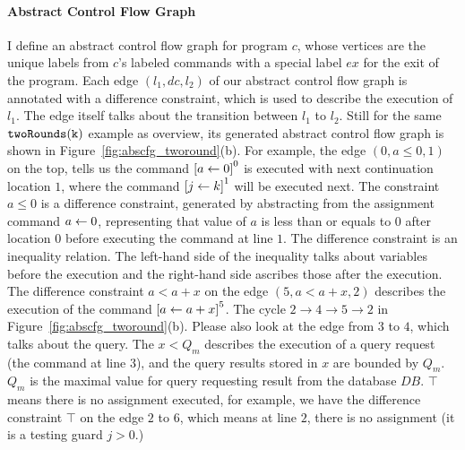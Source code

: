 \paragraph*{Abstract Control Flow Graph}
I define an abstract control flow graph for program $c$, 
whose vertices are the unique labels from $c$'s labeled commands with
a special label $ex$ for the exit of the program. Each edge $(l_1, dc, l_2)$ of our abstract control flow graph is annotated with a difference constraint, which is used to describe the execution of $l_1$. The edge itself talks about the transition between $l_1$ to $l_2$. Still for the same $\mathtt{twoRounds(k)}$ example as overview, its generated abstract control flow graph is shown in Figure~\ref{fig:abscfg_tworound}(b).
For example, the edge $(0, a \leq 0, 1)$ on the top, tells us the command 
$\clabel{\assign{a}{0}}^0$ is executed with next continuation location $1$,
where the 
command $\clabel{\assign{j}{k}}^1$ will be executed next.
The constraint $a \leq 0$ is a difference constraint, generated by abstracting from the assignment command $\mathrel{ a \leftarrow 0 }$,
representing that value of $a$ is less than or equals to $0$ after 
location $0$ before executing the command at line $1$. The difference constraint is an inequality relation. The left-hand side of the inequality talks about variables before the execution and the right-hand side ascribes those after the execution. 
The difference constraint $a < a+x $ on the edge $(5, a < a + x, 2)$ describes the execution of the command $\clabel{\assign{a}{a + x}}^5$.
The cycle $2 \to 4 \to 5 \to 2$ in Figure~\ref{fig:abscfg_tworound}(b). 
Please also look at the edge from $3$ to $4$, which talks about the query. The $x < Q_m$ describes the execution of a query request (the command at line 3), and the query results stored in $x$ are bounded by $Q_m$.
$Q_m$ is the maximal value for query requesting result from the database $DB$. $\top$ means there is no assignment executed, for example, we have the difference constraint $\top$ on the edge $2$ to $6$, which means at line $2$, there is no assignment (it is a testing guard $j>0$.) 
%
